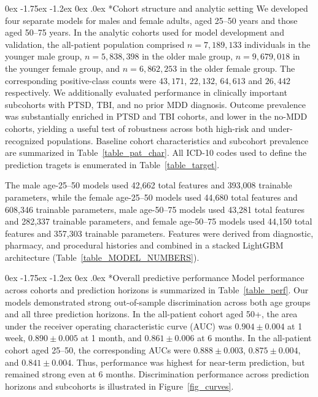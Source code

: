 \documentclass[onecolumn, compsoc,11pt]{IEEEtran}
\makeatletter
\renewcommand\subsection{\@startsection {subsection}{2}{\z@}
  {0ex \@plus -1.75ex \@minus -1.2ex}
  {0ex \@plus.0ex}
  {\fontsize{11}{11}\selectfont\bfseries\sffamily}}
\makeatother
\begin{document}
\subsection*{Cohort structure and analytic setting}
We developed four separate models for males and female adults, aged 25--50 years and those aged 50--75 years. In the analytic cohorts used for model development and validation, the all-patient population comprised $n=7{,}189{,}133$ individuals in the younger male group, $n=5{,}838{,}398$ in the older male group, $n=9{,}679{,}018$ in the younger female group, and $n=6{,}862{,}253$ in the older female group. The corresponding positive-class counts were $43,171$, $22,132$, $64,613$ and $26,442$  respectively. 
We additionally evaluated performance in clinically important subcohorts with PTSD, TBI, and no prior MDD diagnosis. Outcome prevalence was substantially enriched in PTSD and TBI cohorts, and lower in the no-MDD cohorts, yielding a useful test of robustness across both high-risk and under-recognized populations. Baseline cohort characteristics and subcohort prevalence are summarized in Table~\ref{table_pat_char}.
All ICD-10 codes used to define the prediction tragets is enumerated in Table~\ref{table_target}.

The male age-25--50 models used 42,662 total features and 393,008 trainable parameters, while the female age-25--50 models used 44,680 total features and 608,346 trainable parameters, male age-50--75 models used 43,281 total features and 282,337 trainable parameters, and female age-50--75 models used 44,150 total features and 357,303 trainable parameters. Features were derived from diagnostic, pharmacy, and procedural histories and combined in a stacked LightGBM architecture (Table~\ref{table_MODEL_NUMBERS}).

\subsection*{Overall predictive performance}
Model performance across cohorts and prediction horizons is summarized in Table~\ref{table_perf}. Our models demonstrated strong out-of-sample discrimination across both age groups and all three prediction horizons. In the all-patient cohort aged 50+, the area under the receiver operating characteristic curve (AUC) was $0.904 \pm 0.004$ at 1 week, $0.890 \pm 0.005$ at 1 month, and $0.861 \pm 0.006$ at 6 months. In the all-patient cohort aged 25--50, the corresponding AUCs were $0.888 \pm 0.003$, $0.875 \pm 0.004$, and $0.841 \pm 0.004$. Thus, performance was highest for near-term prediction, but remained strong even at 6 months.
Discrimination performance across prediction horizons and subcohorts is illustrated in Figure~\ref{fig_curves}.
\end{document}
